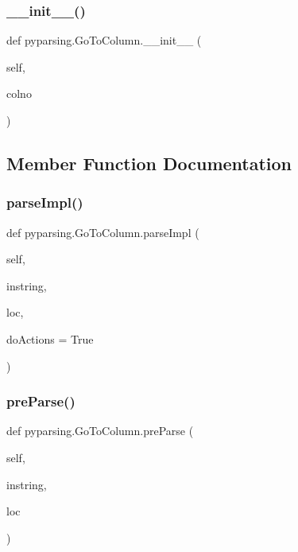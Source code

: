 \subsubsection{\texorpdfstring{\+\_\+\+\_\+init\+\_\+\+\_\+()}{\_\_init\_\_()}}
{\footnotesize\ttfamily def pyparsing.\+Go\+To\+Column.\+\_\+\+\_\+init\+\_\+\+\_\+ (\begin{DoxyParamCaption}\item[{}]{self,  }\item[{}]{colno }\end{DoxyParamCaption})}



\subsection{Member Function Documentation}
\mbox{\label{classpyparsing_1_1GoToColumn_a77805cb3bb515764d6baba635fbbfabf}} 
\subsubsection{\texorpdfstring{parse\+Impl()}{parseImpl()}}
{\footnotesize\ttfamily def pyparsing.\+Go\+To\+Column.\+parse\+Impl (\begin{DoxyParamCaption}\item[{}]{self,  }\item[{}]{instring,  }\item[{}]{loc,  }\item[{}]{do\+Actions = {\ttfamily True} }\end{DoxyParamCaption})}

\mbox{\label{classpyparsing_1_1GoToColumn_ae2a997b3c6a1ea5684b5fa85f7b6ce9c}} 
\subsubsection{\texorpdfstring{pre\+Parse()}{preParse()}}
{\footnotesize\ttfamily def pyparsing.\+Go\+To\+Column.\+pre\+Parse (\begin{DoxyParamCaption}\item[{}]{self,  }\item[{}]{instring,  }\item[{}]{loc }\end{DoxyParamCaption})}



